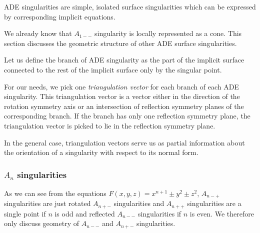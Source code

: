 ADE singularities are simple, isolated surface singularities which can be
expressed by corresponding implicit equations.

We already know that $A_{1--}$ singularity is locally represented as a cone.
This section discusses the geometric structure of other ADE surface singularities.

\begin{definition}
    Let us define the branch of ADE singularity as the part of the implicit surface
    connected to the rest of the implicit surface only by the singular point.
\end{definition}

For our needs, we pick one \textit{triangulation vector} for each branch of
each ADE singularity. This triangulation vector is a vector
either in the direction
of the rotation symmetry axis or an intersection of reflection symmetry planes
of the corresponding branch. If the branch has only one reflection symmetry
plane, the triangulation vector is picked to lie in the reflection
symmetry plane.

In the general case, triangulation vectors serve us
as partial information about the orientation of a singularity with 
respect to its normal form.

\subsubsection*{$A_n$ singularities}

As we can see from the equations 
$F(x,y,z)=x^{n+1}\pm y^2\pm z^2$, $A_{n-+}$
singularities are just rotated $A_{n+-}$ singularities and $A_{n++}$ singularities 
are a single point if $n$ is odd and reflected $A_{n--}$ singularities if $n$ is even. 
We therefore only discuss geometry of $A_{n--}$ and $A_{n+-}$ singularities.

